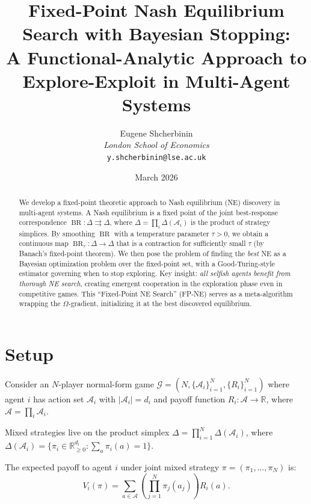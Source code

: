 \documentclass[11pt,a4paper]{article}
\title{Fixed-Point Nash Equilibrium Search with Bayesian Stopping:\\
A Functional-Analytic Approach to Explore-Exploit in Multi-Agent Systems}
\author{Eugene Shcherbinin\\
\textit{London School of Economics}\\
\texttt{y.shcherbinin@lse.ac.uk}}
\date{March 2026}
\DeclareMathOperator{\BR}{BR}
\newcommand{\R}{\mathbb{R}}
\begin{document}
\maketitle

\begin{abstract}
We develop a fixed-point theoretic approach to Nash equilibrium (NE)
discovery in multi-agent systems. A Nash equilibrium is a fixed point of
the joint best-response correspondence $\BR: \Delta \rightrightarrows \Delta$,
where $\Delta = \prod_i \Delta(\mathcal{A}_i)$ is the product of strategy
simplices. By smoothing $\BR$ with a temperature parameter $\tau > 0$,
we obtain a continuous map $\BR_\tau: \Delta \to \Delta$ that is a
contraction for sufficiently small $\tau$ (by Banach's fixed-point theorem).
We then pose the problem of finding the \emph{best} NE as a Bayesian
optimization problem over the fixed-point set, with a Good-Turing-style
estimator governing when to stop exploring. Key insight: \emph{all selfish
agents benefit from thorough NE search}, creating emergent cooperation
in the exploration phase even in competitive games. This ``Fixed-Point
NE Search'' (FP-NE) serves as a meta-algorithm wrapping the $\Omega$-gradient,
initializing it at the best discovered equilibrium.
\end{abstract}

\tableofcontents


\section{Setup}
\label{sec:setup}

Consider an $N$-player normal-form game $\mathcal{G} = (N, \{\mathcal{A}_i\}_{i=1}^N, \{R_i\}_{i=1}^N)$
where agent $i$ has action set $\mathcal{A}_i$ with $|\mathcal{A}_i| = d_i$
and payoff function $R_i : \mathcal{A} \to \R$, where $\mathcal{A} = \prod_i \mathcal{A}_i$.

Mixed strategies live on the product simplex
$\Delta = \prod_{i=1}^N \Delta(\mathcal{A}_i)$, where
$\Delta(\mathcal{A}_i) = \{\pi_i \in \R^{d_i}_{\geq 0} : \sum_{a} \pi_i(a) = 1\}$.

The expected payoff to agent $i$ under joint mixed strategy $\pi = (\pi_1, \ldots, \pi_N)$ is:
\begin{equation}
    V_i(\pi) = \sum_{a \in \mathcal{A}} \left(\prod_{j=1}^N \pi_j(a_j)\right) R_i(a).
\end{equation}
\end{document}
